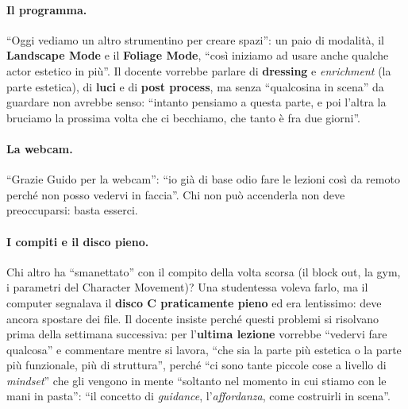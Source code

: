 \paragraph{Il programma.} ``Oggi vediamo un altro strumentino per creare spazi'': un paio
di modalità, il \textbf{Landscape Mode} e il \textbf{Foliage Mode}, ``così iniziamo ad usare
anche qualche actor estetico in più''. Il docente vorrebbe parlare di \textbf{dressing} e
\emph{enrichment} (la parte estetica), di \textbf{luci} e di \textbf{post process}, ma senza
``qualcosina in scena'' da guardare non avrebbe senso: ``intanto pensiamo a questa parte, e
poi l'altra la bruciamo la prossima volta che ci becchiamo, che tanto è fra due giorni''.

\paragraph{La webcam.} ``Grazie Guido per la webcam'': ``io già di base odio fare le
lezioni così da remoto perché non posso vedervi in faccia''. Chi non può accenderla non
deve preoccuparsi: basta esserci.

\paragraph{I compiti e il disco pieno.} Chi altro ha ``smanettato'' con il compito della
volta scorsa (il block out, la gym, i parametri del Character Movement)? Una studentessa
voleva farlo, ma il computer segnalava il \textbf{disco C praticamente pieno} ed era
lentissimo: deve ancora spostare dei file. Il docente insiste perché questi problemi si
risolvano prima della settimana successiva: per l'\textbf{ultima lezione} vorrebbe
``vedervi fare qualcosa'' e commentare mentre si lavora, ``che sia la parte più estetica o
la parte più funzionale, più di struttura'', perché ``ci sono tante piccole cose a livello
di \emph{mindset}'' che gli vengono in mente ``soltanto nel momento in cui stiamo con le mani
in pasta'': ``il concetto di \emph{guidance}, l'\emph{affordanza}, come costruirli in
scena''.

